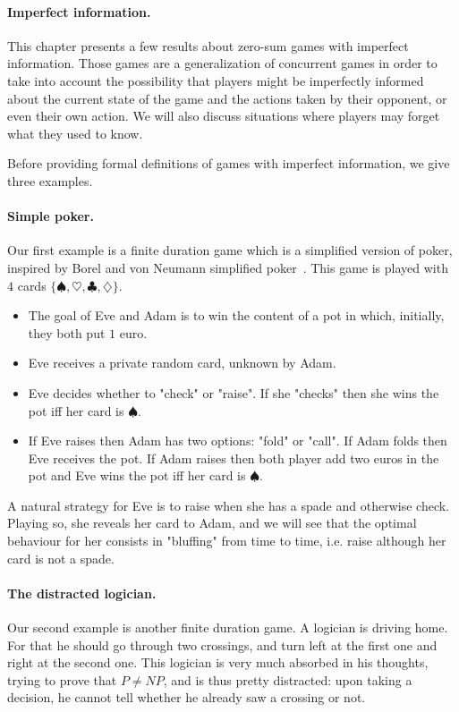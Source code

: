 

\paragraph{Imperfect information.}
This chapter presents a few results about zero-sum games with imperfect information.
Those games are a generalization of concurrent games in order to take into account the possibility that players might be imperfectly informed about the current state of the game
and the actions taken by their opponent, or even their own action. We will also discuss situations where players may forget what they used to know.

Before providing formal definitions of games with imperfect information,
we give three examples.

\paragraph{Simple poker.}
Our first example is a finite duration game which is a simplified version of poker,
inspired by Borel and von Neumann simplified poker~\cite{ferguson}.
This game is played with  $4$ cards $\{\spadesuit,\heartsuit,\clubsuit,\diamondsuit\}$.

\begin{itemize}
\item The goal of Eve and Adam is to win
the content of a pot in which, initially, they both put $1$ euro.
\item Eve receives a private random card, unknown by Adam.
\item Eve decides whether to "check" or "raise".
If she "checks" then she wins the pot iff her card is $\spadesuit$.
\item If Eve raises then Adam has two options: "fold"
or "call". If Adam folds then Eve receives the pot.
If Adam raises then both player add two euros in the pot
and Eve wins the pot iff her card is $\spadesuit$.
\end{itemize}

A natural strategy for Eve is to raise when she has a spade and otherwise
check. Playing so, she reveals her card to Adam,
and we will see that the optimal behaviour for her
consists in "bluffing" from time to time,
i.e. raise although her card is not a spade.

\paragraph{The distracted logician.}
Our second example is another finite duration game.
A logician is driving home. For that he should go through two crossings,
and turn left at the first one and right at the second one.
This logician is very much absorbed in his thoughts,
trying to prove that $P\neq NP$,
and is thus pretty distracted: upon taking a decision, he cannot  tell
whether he already saw a crossing or not.

